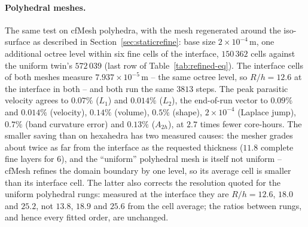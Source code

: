 \documentclass[preprint,3p,11pt]{elsarticle}
\begin{document}
\paragraph{Polyhedral meshes.}
The same test on cfMesh polyhedra, with the mesh regenerated around the iso-surface as
described in Section~\ref{sec:staticrefine}: base size $2\times10^{-4}$\,m, one
additional octree level within six fine cells of the interface, $150\,362$ cells against
the uniform twin's $572\,039$ (last row of Table~\ref{tab:refined-eq}). The interface
cells of both meshes measure $7.937\times10^{-5}$\,m -- the same octree level, so
$R/h=12.6$ at the interface in both -- and both run the same $3813$ steps. The peak
parasitic velocity agrees to $0.07\%$ ($L_1$) and $0.014\%$ ($L_2$), the end-of-run
vector to $0.09\%$ and $0.014\%$ (velocity), $0.14\%$ (volume), $0.5\%$ (shape),
$2\times10^{-4}$ (Laplace jump), $0.7\%$ (band curvature error) and $0.13\%$
($A_{2h}$), at $2.7$ times fewer core-hours. The smaller saving than on hexahedra has two
measured causes: the mesher grades about twice as far from the interface as the requested
thickness ($11.8$ complete fine layers for $6$), and the ``uniform'' polyhedral mesh is
itself not uniform -- cfMesh refines the domain boundary by one level, so its average
cell is smaller than its interface cell. The latter also corrects the resolution quoted
for the uniform polyhedral rungs: measured at the interface they are $R/h=12.6$, $18.0$
and $25.2$, not $13.8$, $18.9$ and $25.6$ from the cell average; the ratios between
rungs, and hence every fitted order, are unchanged.

\begin{table}[t]
  \centering
  \caption{Refined against uniform at matched fine spacing, time step and step count:
  relative difference of each metric at $t=T=0.025$\,s and of the peak parasitic velocity
  norms over the run; last column the uniform-to-refined core-hour ratio. Regenerated by
  \texttt{make\_refined\_equivalence\_table.py}.}
  \label{tab:refined-eq}
  \resizebox{\linewidth}{!}{}
\end{table}

\begin{table}[t]
  \centering
  \caption{Least-squares orders $p$ (with the correlation $R$ and the number of rungs) of
  each metric at $t=T$ against the fine spacing, refined and uniform ladders side by side.
  Regenerated by \texttt{make\_refined\_equivalence\_table.py}.}
  \label{tab:refined-orders}
  \resizebox{\linewidth}{!}{}
\end{table}
\end{document}
